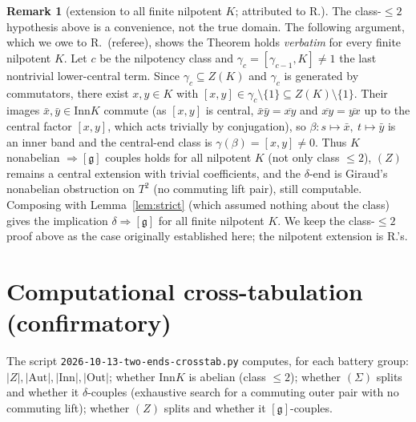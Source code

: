 \documentclass[11pt]{article}
\theoremstyle{definition}
\newtheorem{remark}[theorem]{Remark}
\newcommand{\Aut}{\mathrm{Aut}}
\newcommand{\Inn}{\mathrm{Inn}}
\newcommand{\Out}{\mathrm{Out}}
\newcommand{\gerbe}{\mathfrak{g}}
\begin{document}
\begin{remark}[extension to all finite nilpotent $K$; attributed to R.]\label{rem:nilpotent}
The class-$\le2$ hypothesis above is a convenience, not the true domain. The following argument,
which we owe to R.\ (referee), shows the Theorem holds \emph{verbatim} for every finite nilpotent
$K$. Let $c$ be the nilpotency class and $\gamma_c=[\gamma_{c-1},K]\neq1$ the last nontrivial
lower-central term. Since $\gamma_c\subseteq Z(K)$ and $\gamma_c$ is generated by commutators,
there exist $x,y\in K$ with $[x,y]\in\gamma_c\setminus\{1\}\subseteq Z(K)\setminus\{1\}$. Their
images $\bar x,\bar y\in\Inn K$ commute (as $[x,y]$ is central, $\bar x\bar y=\overline{xy}$ and
$\overline{xy}=\overline{yx}$ up to the central factor $[x,y]$, which acts trivially by
conjugation), so $\beta:s\mapsto\bar x,\ t\mapsto\bar y$ is an inner band and the central-end
class is $\gamma(\beta)=[x,y]\neq0$. Thus $K$ nonabelian $\Rightarrow[\gerbe]$ couples holds for
all nilpotent $K$ (not only class $\le2$), $(Z)$ remains a central extension with trivial
coefficients, and the $\delta$-end is Giraud's nonabelian obstruction on $T^2$ (no commuting lift
pair), still computable. Composing with Lemma~\ref{lem:strict} (which assumed nothing about the
class) gives the implication $\delta\Rightarrow[\gerbe]$ for all finite nilpotent $K$. We keep
the class-$\le2$ proof above as the case originally established here; the nilpotent extension is
R.'s.
\end{remark}

\section{Computational cross-tabulation (confirmatory)}\label{sec:crosstab}

The script \texttt{2026-10-13-two-ends-crosstab.py} computes, for each battery group:
$|Z|,|\Aut|,|\Inn|,|\Out|$; whether $\Inn K$ is abelian (class $\le2$); whether $(\Sigma)$
splits and whether it $\delta$-couples (exhaustive search for a commuting outer pair with no
commuting lift); whether $(Z)$ splits and whether it $[\gerbe]$-couples.
\end{document}
